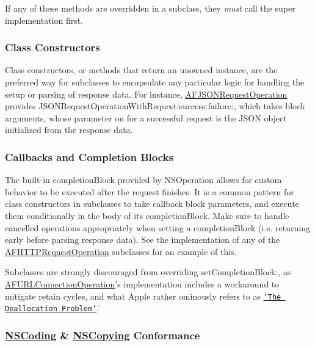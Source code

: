 If any of these methods are overridden in a subclass, they {\itshape must} call the {\ttfamily super} implementation first.

\subsubsection*{Class Constructors}

Class constructors, or methods that return an unowned instance, are the preferred way for subclasses to encapsulate any particular logic for handling the setup or parsing of response data. For instance, {\ttfamily \hyperlink{interface_a_f_j_s_o_n_request_operation}{A\-F\-J\-S\-O\-N\-Request\-Operation}} provides {\ttfamily J\-S\-O\-N\-Request\-Operation\-With\-Request\-:success\-:failure\-:}, which takes block arguments, whose parameter on for a successful request is the J\-S\-O\-N object initialized from the {\ttfamily response data}.

\subsubsection*{Callbacks and Completion Blocks}

The built-\/in {\ttfamily completion\-Block} provided by {\ttfamily N\-S\-Operation} allows for custom behavior to be executed after the request finishes. It is a common pattern for class constructors in subclasses to take callback block parameters, and execute them conditionally in the body of its {\ttfamily completion\-Block}. Make sure to handle cancelled operations appropriately when setting a {\ttfamily completion\-Block} (i.\-e. returning early before parsing response data). See the implementation of any of the {\ttfamily \hyperlink{interface_a_f_h_t_t_p_request_operation}{A\-F\-H\-T\-T\-P\-Request\-Operation}} subclasses for an example of this.

Subclasses are strongly discouraged from overriding {\ttfamily set\-Completion\-Block\-:}, as {\ttfamily \hyperlink{interface_a_f_u_r_l_connection_operation}{A\-F\-U\-R\-L\-Connection\-Operation}}'s implementation includes a workaround to mitigate retain cycles, and what Apple rather ominously refers to as \href{http://developer.apple.com/library/ios/#technotes/tn2109/}{\tt \char`\"{}\-The Deallocation Problem\char`\"{}}.

\subsubsection*{\hyperlink{class_n_s_coding-p}{N\-S\-Coding} \& \hyperlink{class_n_s_copying-p}{N\-S\-Copying} Conformance}

